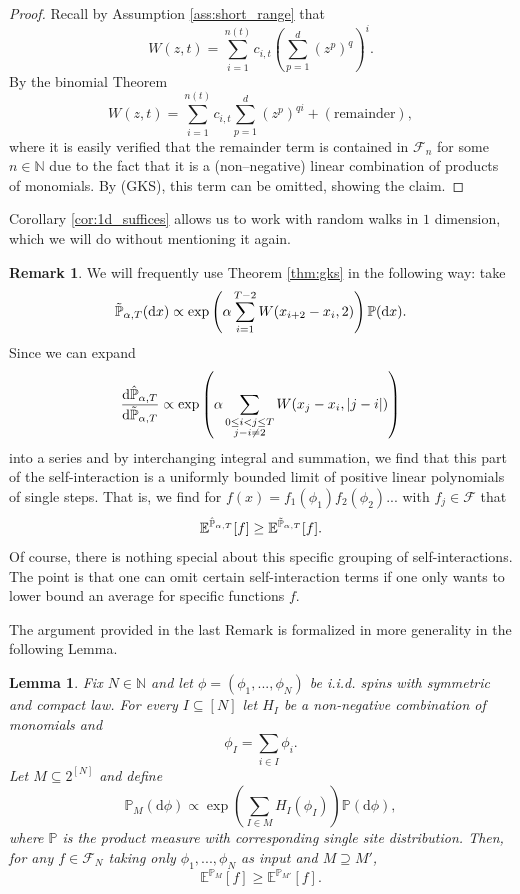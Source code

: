 \documentclass[reqno,11pt]{amsart}
\newcommand{\1}{\mathds{1}}
\theoremstyle{plain}
\newtheorem{lemma}[theorem]{Lemma}
\theoremstyle{definition}
\newtheorem{remark}[theorem]{Remark}
\numberwithin{equation}{section}
\newcommand{\caF}{{\mathcal F}}
\newcommand{\bbE}{{\mathbb E}}
\newcommand{\bbN}{{\mathbb N}}
\newcommand{\bbP}{{\mathbb P}}
\newcommand{\de}{{\mathrm{d}}}
\newcommand{\bbPh}{\hat{\bbP}}
\newcommand{\bbPw}{\Tilde{\bbP}}
\def\lt{\left}
\def\rt{\right}
\begin{document}
\begin{proof}
   Recall by Assumption \ref{ass:short_range} that
   $$W(z,t) = \sum\limits_{i=1} ^{n(t)} c_{i,t} \lt( \sum\limits_{p=1} ^d (z^p) ^q \rt)^i.$$
   By the binomial Theorem
   $$W(z,t) = \sum\limits_{i=1} ^{n(t)} c_{i,t} \sum\limits_{p=1} ^d   (z^p) ^{qi} + (\text{remainder}),$$
   where it is easily verified that the remainder term is contained in $\caF_n$ for some $n \in \bbN$ due to the fact that it is a (non--negative) linear combination of products of monomials. By (GKS), this term can be omitted, showing the claim.
\end{proof}
Corollary \ref{cor:1d_suffices} allows us to work with random walks in $1$ dimension, which we will do without mentioning it again.

\begin{remark}
    \label{rem:density_replacement}
    We will frequently use Theorem \ref{thm:gks} in the following way: take 
    \begin{equation}
        \label{equ:nn_measure}
        \bbPw_{\alpha,T}(\de x) \propto \exp \lt( \alpha
 \sum\limits_{i=1} ^{T-2} W( x_{i+2} - x_i , 2) \rt) \bbP(\de x).
    \end{equation}
 Since we can expand 
 $$\frac{ \de \bbPh_{\alpha,T} }{\de \bbPw_{\alpha,T}} \propto \exp \lt(\alpha \sum_{\substack{0 \le i < j \le T \\ j-i \neq 2}} W(x_j - x_i , |j-i|)  \rt)$$
 into a series and by interchanging integral and summation, we find that this part of the self-interaction is a uniformly bounded limit of positive linear polynomials of single steps. That is, we find for $f(x) = f_1(\phi_1)f_2 (\phi_2)...$ with $f_j \in \caF$ that
 $$\bbE^{\bbPh_{\alpha,T}}[f] \ge \bbE^{\bbPw_{\alpha,T}}[f].$$
 Of course, there is nothing special about this specific grouping of self-interactions. The point is that one can omit certain self-interaction terms if one only wants to lower bound an average for specific functions $f$.
\end{remark}
The argument provided in the last Remark is formalized in more generality in the following Lemma.
\begin{lemma}
    \label{lemma:omitting_interactions}
    Fix $N \in \bbN$ and let $\phi = (\phi_1,...,\phi_N)$ be i.i.d. spins with symmetric and compact law. For every $I \subseteq [N]$ let
    $H_I$ be a non-negative combination of monomials and 
    $$\phi_I = \sum\limits_{i \in I} \phi_i.$$
    Let $M \subseteq 2^{[N]}$ and define
    $$\bbP_{M}(\de \phi) \propto \exp \lt( \sum\limits_{I \in M} H_I (\phi_I) \rt) \bbP(\de \phi),$$
    where $\bbP$ is the product measure with corresponding single site distribution.
    Then, for any $f \in \caF_N$ taking only $\phi_1,...,\phi_N$ as input and $M \supseteq M'$,
    $$\bbE^{\bbP_M}[f] \ge \bbE^{\bbP_{M'}}[f].$$
\end{lemma}
\end{document}
